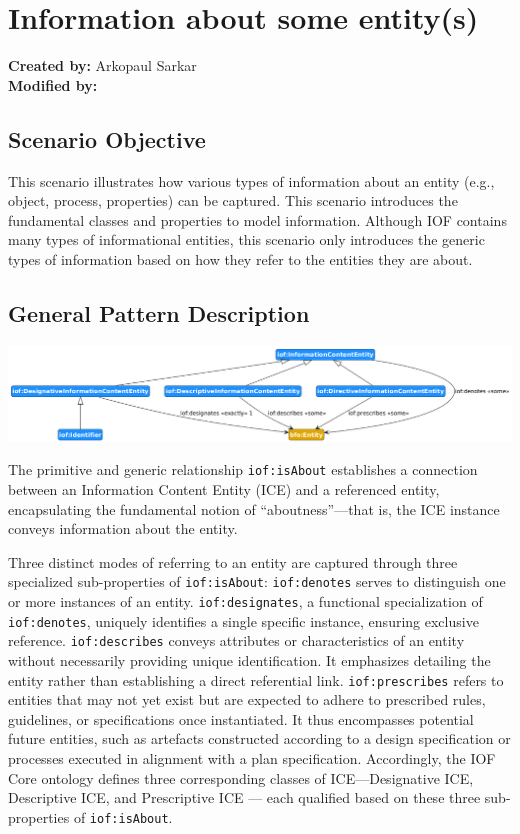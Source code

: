 \section{Information about some entity(s)}
\label{sec-information-about}

\textbf{Created by:} Arkopaul Sarkar \\
\textbf{Modified by:}

\subsection*{Scenario Objective}
This scenario illustrates how various types of information about an entity (e.g., object, process, properties) can be captured. This scenario introduces the fundamental classes and properties to model information. Although IOF contains many types of informational entities, this scenario only introduces the generic types of information based on how they refer to the entities they are about.  

\subsection*{General Pattern Description}

\includegraphics[scale=0.35]{scenarios/information-and-aboutness/images/general-information-aboutness.png}

The primitive and generic relationship \texttt{iof:isAbout} establishes a connection between an Information Content Entity (ICE) and a referenced entity, encapsulating the fundamental notion of ``aboutness''—that is, the ICE instance conveys information about the entity.

Three distinct modes of referring to an entity are captured through three specialized sub-properties of \texttt{iof:isAbout}: \texttt{iof:denotes} serves to distinguish one or more instances of an entity.
\texttt{iof:designates}, a functional specialization of \texttt{iof:denotes}, uniquely identifies a single specific instance, ensuring exclusive reference.
\texttt{iof:describes} conveys attributes or characteristics of an entity without necessarily providing unique identification. It emphasizes detailing the entity rather than establishing a direct referential link.
\texttt{iof:prescribes} refers to entities that may not yet exist but are expected to adhere to prescribed rules, guidelines, or specifications once instantiated. It thus encompasses potential future entities, such as artefacts constructed according to a design specification or processes executed in alignment with a plan specification.
Accordingly, the IOF Core ontology defines three corresponding classes of ICE—Designative ICE, Descriptive ICE, and Prescriptive ICE — each qualified based on these three sub-properties of \texttt{iof:isAbout}. 

